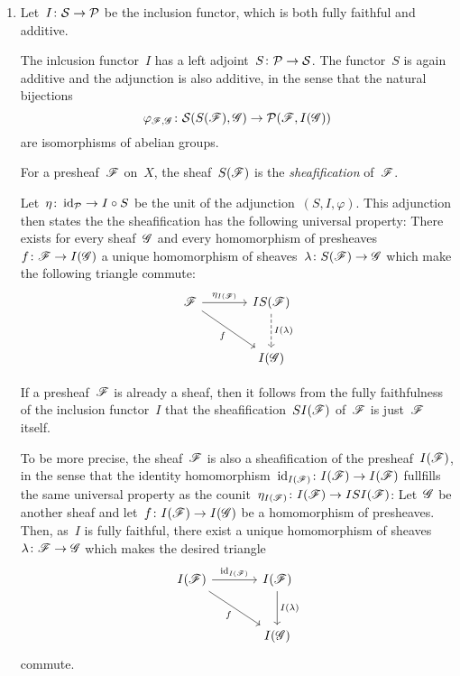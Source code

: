 \begin{example}
\begin{enumerate}
    \item
      Let~$I \colon \mathcal{S} \to \mathcal{P}$ be the inclusion functor, which is both fully faithful and additive.
      
      \begin{fact}
        The inlcusion functor~$I$ has a left adjoint~$S \colon \mathcal{P} \to \mathcal{S}$.
        The functor~$S$ is again additive and the adjunction is also additive, in the sense that the natural bijections
        \[
                  \varphi_{\mathscr{F},\mathscr{G}}
          \colon  \mathcal{S}(S(\mathscr{F}), \mathscr{G})
          \to     \mathcal{P}(\mathscr{F}, I(\mathscr{G}))
        \]
        are isomorphisms of abelian groups.
      \end{fact}
      
      \begin{definitionnonum}
        For a presheaf~$\mathscr{F}$ on~$X$, the sheaf~$S(\mathscr{F})$ is the \emph{sheafification} of~$\mathscr{F}$.
      \end{definitionnonum}
      
      Let~$\eta \colon \operatorname{id}_{\mathcal{P}} \to I \circ S$ be the unit of the adjunction~$(S,I,\varphi)$.
      This adjunction then states the the sheafification has the following universal property:      
      There exists for every sheaf~$\mathscr{G}$ and every homomorphism of presheaves~$f \colon \mathscr{F} \to I(\mathscr{G})$ a unique homomorphism of sheaves~$\lambda \colon S(\mathscr{F}) \to \mathscr{G}$ which make the following triangle commute:
      \[
        \begin{tikzcd}[sep = large]
            \Fs
            \arrow{r}[above]{\eta_{I(\Fs)}}
            \arrow{dr}[below left]{f}
          & IS(\Fs)
            \arrow[dashed]{d}[right]{I(\lambda)}
          \\
            {}
          & I(\Gs)
        \end{tikzcd}
      \]
      
      If a presheaf~$\mathscr{F}$ is already a sheaf, then it follows from the fully faithfulness of the inclusion functor~$I$ that the sheafification~$SI(\mathscr{F})$ of~$\mathscr{F}$ is just~$\mathscr{F}$ itself.
      
      To be more precise, the sheaf~$\mathscr{F}$ is also a sheafification of the presheaf~$I(\mathscr{F})$, in the sense that the identity homomorphism~$\operatorname{id}_{I(\mathscr{F})} \colon I(\mathscr{F}) \to I(\mathscr{F})$ fullfills the same universal property as the counit~$\eta_{I(\mathscr{F})} \colon I(\mathscr{F}) \to ISI(\mathscr{F})$:
      Let~$\mathscr{G}$ be another sheaf and let~$f \colon I(\mathscr{F}) \to I(\mathscr{G})$ be a homomorphism of presheaves.
      Then, as~$I$ is fully faithful, there exist a unique homomorphism of sheaves~$\lambda \colon \mathscr{F} \to \mathscr{G}$ which makes the desired triangle
      \[
        \begin{tikzcd}[sep = large]
            I(\Fs)
            \arrow{r}[above]{\id_{I(\Fs)}}
            \arrow{dr}[below left]{f}
          & I(\Fs)
            \arrow{d}[right]{I(\lambda)}
          \\
            {}
          & I(\Gs)
        \end{tikzcd}
      \]
      commute.
      

\end{enumerate}
\end{example}
